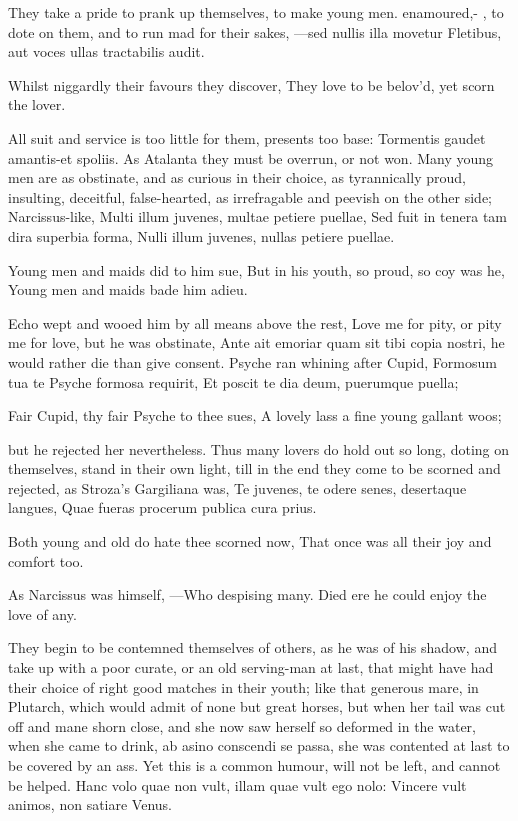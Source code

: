 {They take a pride to prank up themselves, to make young men.
enamoured,- , to dote on them,
and to run mad for their sakes,
---sed nullis illa movetur
Fletibus, aut voces ullas tractabilis audit.

Whilst niggardly their favours they discover,
They love to be belov'd, yet scorn the lover.

All suit and service is too little for them, presents too base:
Tormentis gaudet amantis-et spoliis. As Atalanta they must be overrun,
or not won. Many young men are as obstinate, and as curious in their
choice, as tyrannically proud, insulting, deceitful, false-hearted, as
irrefragable and peevish on the other side; Narcissus-like,
Multi illum juvenes, multae petiere puellae,
Sed fuit in tenera tam dira superbia forma,
Nulli illum juvenes, nullas petiere puellae.

Young men and maids did to him sue,
But in his youth, so proud, so coy was he,
Young men and maids bade him adieu.

Echo wept and wooed him by all means above the rest, Love me for pity,
or pity me for love, but he was obstinate, Ante ait emoriar quam sit
tibi copia nostri, he would rather die than give consent. Psyche ran
whining after Cupid,
Formosum tua te Psyche formosa requirit,
Et poscit te dia deum, puerumque puella;

Fair Cupid, thy fair Psyche to thee sues,
A lovely lass a fine young gallant woos;

but he rejected her nevertheless. Thus many lovers do hold out so long,
doting on themselves, stand in their own light, till in the end they
come to be scorned and rejected, as Stroza's Gargiliana was,
Te juvenes, te odere senes, desertaque langues,
Quae fueras procerum publica cura prius.

Both young and old do hate thee scorned now,
That once was all their joy and comfort too.

As Narcissus was himself,
---Who despising many.
Died ere he could enjoy the love of any.

They begin to be contemned themselves of others, as he was of his
shadow, and take up with a poor curate, or an old serving-man at last,
that might have had their choice of right good matches in their youth;
like that generous mare, in Plutarch, which would admit of none
but great horses, but when her tail was cut off and mane shorn close,
and she now saw herself so deformed in the water, when she came to
drink, ab asino conscendi se passa, she was contented at last to be
covered by an ass. Yet this is a common humour, will not be left, and
cannot be helped.
Hanc volo quae non vult, illam quae vult ego nolo:
Vincere vult animos, non satiare Venus.

}
